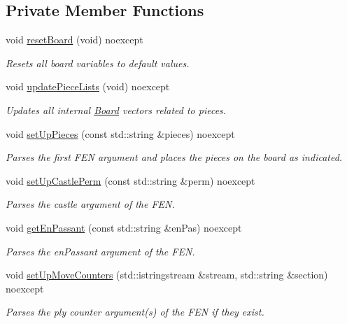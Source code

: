 \subsection*{Private Member Functions}
\begin{DoxyCompactItemize}
\item 
void \mbox{\hyperlink{classBoard_a72d31a84b6f4491b41ad249a047ffa6f}{reset\+Board}} (void) noexcept
\begin{DoxyCompactList}\small\item\em Resets all board variables to default values. \end{DoxyCompactList}\item 
void \mbox{\hyperlink{classBoard_a2b86adf733a5509848f0cc689be49866}{update\+Piece\+Lists}} (void) noexcept
\begin{DoxyCompactList}\small\item\em Updates all internal \mbox{\hyperlink{classBoard}{Board}} vectors related to pieces. \end{DoxyCompactList}\item 
void \mbox{\hyperlink{classBoard_a097a5d64cd3772c539f7ce6dda9a929a}{set\+Up\+Pieces}} (const std\+::string \&pieces) noexcept
\begin{DoxyCompactList}\small\item\em Parses the first F\+EN argument and places the pieces on the board as indicated. \end{DoxyCompactList}\item 
void \mbox{\hyperlink{classBoard_acc2461d64efdfd469ec2dcada47c45b0}{set\+Up\+Castle\+Perm}} (const std\+::string \&perm) noexcept
\begin{DoxyCompactList}\small\item\em Parses the castle argument of the F\+EN. \end{DoxyCompactList}\item 
void \mbox{\hyperlink{classBoard_a9e6c964048b76b8f93c583383efe80ac}{get\+En\+Passant}} (const std\+::string \&en\+Pas) noexcept
\begin{DoxyCompactList}\small\item\em Parses the en\+Passant argument of the F\+EN. \end{DoxyCompactList}\item 
void \mbox{\hyperlink{classBoard_a635ae307c20455554c2cea611c7561f1}{set\+Up\+Move\+Counters}} (std\+::istringstream \&stream, std\+::string \&section) noexcept
\begin{DoxyCompactList}\small\item\em Parses the ply counter argument(s) of the F\+EN if they exist. \end{DoxyCompactList}\end{DoxyCompactItemize}


